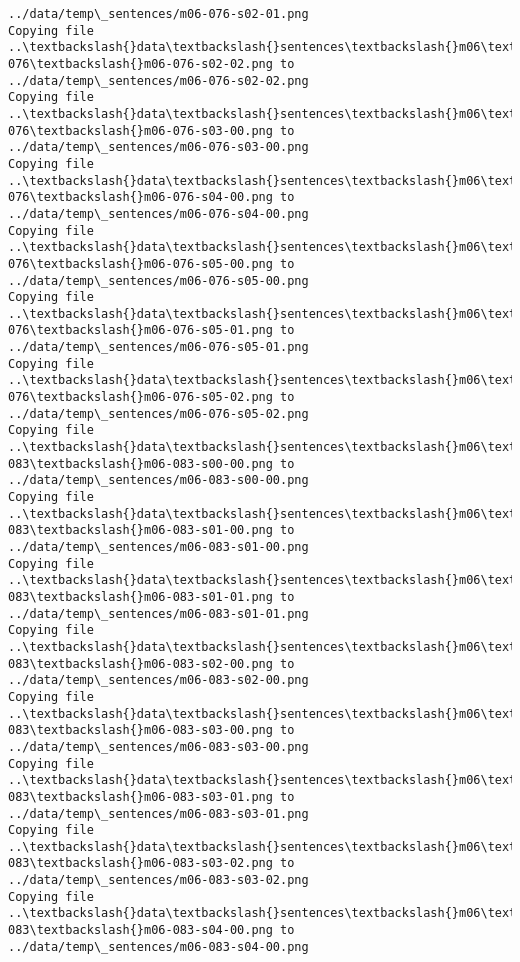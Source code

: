 \documentclass[11pt]{article}
\begin{document}
\begin{Verbatim}[commandchars=\\\{\}]
../data/temp\_sentences/m06-076-s02-01.png
Copying file ..\textbackslash{}data\textbackslash{}sentences\textbackslash{}m06\textbackslash{}m06-076\textbackslash{}m06-076-s02-02.png to
../data/temp\_sentences/m06-076-s02-02.png
Copying file ..\textbackslash{}data\textbackslash{}sentences\textbackslash{}m06\textbackslash{}m06-076\textbackslash{}m06-076-s03-00.png to
../data/temp\_sentences/m06-076-s03-00.png
Copying file ..\textbackslash{}data\textbackslash{}sentences\textbackslash{}m06\textbackslash{}m06-076\textbackslash{}m06-076-s04-00.png to
../data/temp\_sentences/m06-076-s04-00.png
Copying file ..\textbackslash{}data\textbackslash{}sentences\textbackslash{}m06\textbackslash{}m06-076\textbackslash{}m06-076-s05-00.png to
../data/temp\_sentences/m06-076-s05-00.png
Copying file ..\textbackslash{}data\textbackslash{}sentences\textbackslash{}m06\textbackslash{}m06-076\textbackslash{}m06-076-s05-01.png to
../data/temp\_sentences/m06-076-s05-01.png
Copying file ..\textbackslash{}data\textbackslash{}sentences\textbackslash{}m06\textbackslash{}m06-076\textbackslash{}m06-076-s05-02.png to
../data/temp\_sentences/m06-076-s05-02.png
Copying file ..\textbackslash{}data\textbackslash{}sentences\textbackslash{}m06\textbackslash{}m06-083\textbackslash{}m06-083-s00-00.png to
../data/temp\_sentences/m06-083-s00-00.png
Copying file ..\textbackslash{}data\textbackslash{}sentences\textbackslash{}m06\textbackslash{}m06-083\textbackslash{}m06-083-s01-00.png to
../data/temp\_sentences/m06-083-s01-00.png
Copying file ..\textbackslash{}data\textbackslash{}sentences\textbackslash{}m06\textbackslash{}m06-083\textbackslash{}m06-083-s01-01.png to
../data/temp\_sentences/m06-083-s01-01.png
Copying file ..\textbackslash{}data\textbackslash{}sentences\textbackslash{}m06\textbackslash{}m06-083\textbackslash{}m06-083-s02-00.png to
../data/temp\_sentences/m06-083-s02-00.png
Copying file ..\textbackslash{}data\textbackslash{}sentences\textbackslash{}m06\textbackslash{}m06-083\textbackslash{}m06-083-s03-00.png to
../data/temp\_sentences/m06-083-s03-00.png
Copying file ..\textbackslash{}data\textbackslash{}sentences\textbackslash{}m06\textbackslash{}m06-083\textbackslash{}m06-083-s03-01.png to
../data/temp\_sentences/m06-083-s03-01.png
Copying file ..\textbackslash{}data\textbackslash{}sentences\textbackslash{}m06\textbackslash{}m06-083\textbackslash{}m06-083-s03-02.png to
../data/temp\_sentences/m06-083-s03-02.png
Copying file ..\textbackslash{}data\textbackslash{}sentences\textbackslash{}m06\textbackslash{}m06-083\textbackslash{}m06-083-s04-00.png to
../data/temp\_sentences/m06-083-s04-00.png

\end{Verbatim}
\end{document}
